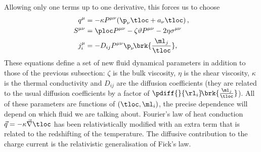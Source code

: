 Allowing only one terms up to one derivative, this forces us to choose
%
\begin{equation}\label{visc:eq}
\begin{split}
 q^\mu &= -\kappa P^{\mu\nu} (\p_\nu\tloc + a_\nu\tloc)\,,
 \\
 S^{\mu\nu} &= \ploc P^{\mu\nu} -\zeta \vartheta P^{\mu\nu} -
  2\eta\sigma^{\mu\nu}
 \\
 j^\mu_{i}
    &= - D_{ij} P^{\mu\nu}\p_\nu\! \brk{\frac{\ml_j}{\tloc}},
\end{split}
\end{equation}
%
These equations define a set of new fluid dynamical parameters in addition to those of the previous subsection: $\zeta$ is the bulk viscosity, $\eta$ is the shear viscosity, $\kappa$ is the thermal conductivity and $D_{ij}$ are the diffusion coefficients (they are related to the usual diffusion coefficients by a factor of $\pdiff{}{\rl_i}\! \brk{\frac{\ml_j}{\tloc}}$). All of these parameters are functions of $(\tloc,\ml_i)$, the precise dependence will depend on which fluid we are talking about. Fourier's law of heat conduction $\vec{q} = -\kappa \vec{\nabla} \tloc$ has been relativistically modified with an extra term that is related to the redshifting of the temperature. The diffusive contribution to the charge current is the relativistic generalisation of Fick's law.

